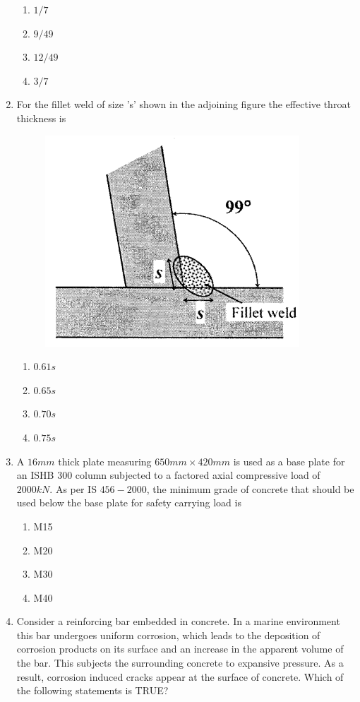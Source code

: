 \documentclass[journal,12pt,onecolumn]{IEEEtran}
\theoremstyle{remark}
\begin{document}
\begin{enumerate}
\hfill{}
\begin{enumerate}
\item $1/7$
\item $9/49$
\item $12/49$
\item $3/7$
\end{enumerate}

\item  For the fillet weld of size 's' shown in the adjoining figure the effective throat thickness is

\hfill{}
\begin{figure}[H]
\centering
\includegraphics[width=0.3\columnwidth]{figs/q4.png}
\caption*{}
\label{fig:Q.4}
\end{figure}
\begin{enumerate}
\item $0.61s$
\item $0.65s$
\item $0.70s$
\item $0.75s$
\end{enumerate}

\item A $16mm$ thick plate measuring $650mm\times420mm$ is used as a base plate for an ISHB 300 column subjected to a factored axial compressive load of $2000kN$. As per IS $456-2000$, the minimum grade of concrete that should be used below the base plate for safety carrying load is

\hfill{}
\begin{enumerate}
\item M15
\item M20
\item M30
\item M40
\end{enumerate}

\item Consider a reinforcing bar embedded in concrete. In a marine environment this bar undergoes uniform corrosion, which leads to the deposition of corrosion products on its surface and an increase in the apparent volume of the bar. This subjects the surrounding concrete to expansive pressure. As a result, corrosion induced cracks appear at the surface of concrete. Which of the following statements is TRUE?


\end{enumerate}
\end{document}
